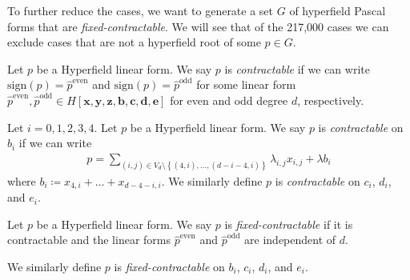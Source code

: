 To further reduce the cases, we want to generate a set \( G \) of hyperfield Pascal forms that are \emph{fixed-contractable}. We will see that of the 217,000 cases we can exclude cases that are not a hyperfield root of some \( p \in G \).

\begin{definition}
    Let \( p \) be a Hyperfield linear form. We say \( p \) is \emph{contractable} if we can write \( \mathrm{sign}(p) = \hat p^{\mathrm{even}} \) and  \( \mathrm{sign}(p) = \hat p^{\mathrm{odd}} \) for some linear form \( \hat p^{\mathrm{even}}, \hat p^{\mathrm{odd}} \in H[\mathbf{x}, \mathbf{y}, \mathbf{z}, \mathbf{b}, \mathbf{c}, \mathbf{d}, \mathbf{e}] \) for even and odd degree \( d \), respectively. 
\end{definition}

\begin{definition}
    Let \( i = 0,1,2,3,4 \).
    Let \( p \) be a Hyperfield linear form. We say \( p \) is \emph{contractable} on \( b_i \) if we can write
    \begin{align*}
        p = \sum_{(i,j) \in V_d \setminus \left\{ (4,i), \dots, (d-i-4, i) \right\}} \lambda_{i,j} x_{i,j}  +\lambda b_i
    \end{align*}
    where \( b_i \coloneqq x_{4,i} + \dots + x_{d-4-i,i} \). We similarly define \( p \) is \emph{contractable} on \( c_i \), \( d_i \), and \( e_i \).
\end{definition}

\begin{definition}
    Let \( p \) be a Hyperfield linear form. We say \( p \) is \emph{fixed-contractable} if it is contractable and the linear forms \( \hat p^{\mathrm{even}} \) and \( \hat p^{\mathrm{odd}} \) are independent of \( d \). 

    We similarly define \( p \) is \emph{fixed-contractable} on \( b_i \), \( c_i \), \( d_i \), and \( e_i \).
\end{definition}
